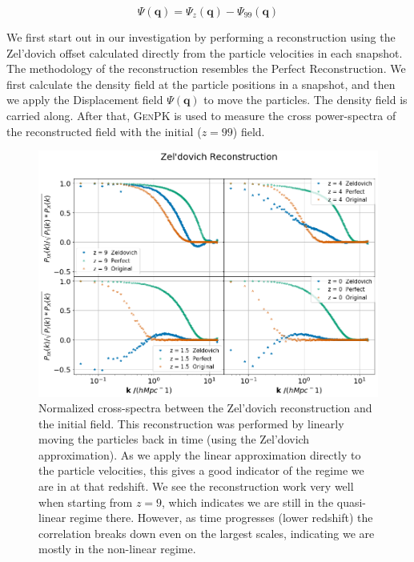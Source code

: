 \begin{equation}
    \Psi(\textbf{q}) = \Psi_z(\textbf{q}) - \Psi_{99}(\textbf{q})
    \label{eq:4.2}
\end{equation}

We first start out in our investigation by performing a reconstruction using the Zel'dovich offset calculated directly from the particle velocities in each snapshot. The methodology of the reconstruction resembles the Perfect Reconstruction. We first calculate the density field at the particle positions in a snapshot, and then we apply the Displacement field $\Psi(\textbf{q})$ to move the particles. The density field is carried along. After that, \textsc{GenPK} is used to measure the cross power-spectra of the reconstructed field with the initial ($z=99$) field.

\begin{figure}
    \centering
    \includegraphics[width=1\columnwidth]{images/realRecon/zeld.png}%
    
    \caption{
    Normalized cross-spectra between the Zel'dovich reconstruction and the initial field. This reconstruction was performed by linearly moving the particles back in time (using the Zel'dovich approximation). As we apply the linear approximation directly to the particle velocities, this gives a good indicator of the regime we are in at that redshift. We see the reconstruction work very well when starting from $z=9$, which indicates we are still in the quasi-linear regime there. However, as time progresses (lower redshift) the correlation breaks down even on the largest scales, indicating we are mostly in the non-linear regime. 
    }
    
    \label{fig:4.1}
\end{figure}

